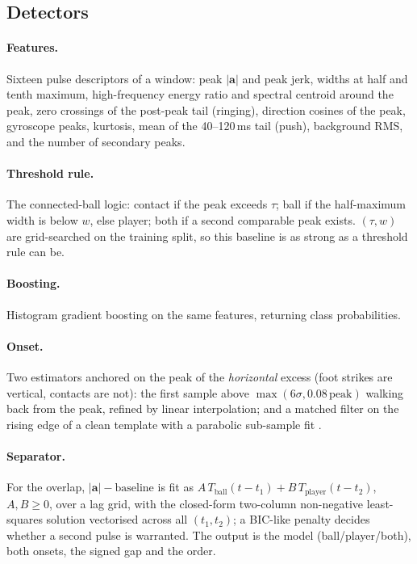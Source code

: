 \subsection{Detectors}
\paragraph{Features.} Sixteen pulse descriptors of a window: peak
$|\mathbf a|$ and peak jerk, widths at half and tenth maximum, high-frequency
energy ratio and spectral centroid around the peak, zero crossings of the
post-peak tail (ringing), direction cosines of the peak, gyroscope peaks,
kurtosis, mean of the 40--120\,ms tail (push), background RMS, and the number
of secondary peaks.
\paragraph{Threshold rule.} The connected-ball logic: contact if the peak
exceeds $\tau$; ball if the half-maximum width is below $w$, else player; both
if a second comparable peak exists. $(\tau,w)$ are grid-searched on the
training split, so this baseline is as strong as a threshold rule can be.
\paragraph{Boosting.} Histogram gradient boosting \cite{friedman2001greedy} on
the same features, returning class probabilities.
\paragraph{Onset.} Two estimators anchored on the peak of the \emph{horizontal}
excess (foot strikes are vertical, contacts are not): the first sample above
$\max(6\sigma, 0.08\,\text{peak})$ walking back from the peak, refined by
linear interpolation; and a matched filter on the rising edge of a clean
template with a parabolic sub-sample fit \cite{turin1960introduction}.
\paragraph{Separator.} For the overlap, $|\mathbf a| - \text{baseline}$ is fit
as $A\,T_{\text{ball}}(t-t_1) + B\,T_{\text{player}}(t-t_2)$, $A,B\ge 0$, over a
lag grid, with the closed-form two-column non-negative least-squares solution
\cite{lawson1974solving} vectorised across all $(t_1,t_2)$; a BIC-like penalty
decides whether a second pulse is warranted. The output is the model
(ball/player/both), both onsets, the signed gap and the order.

